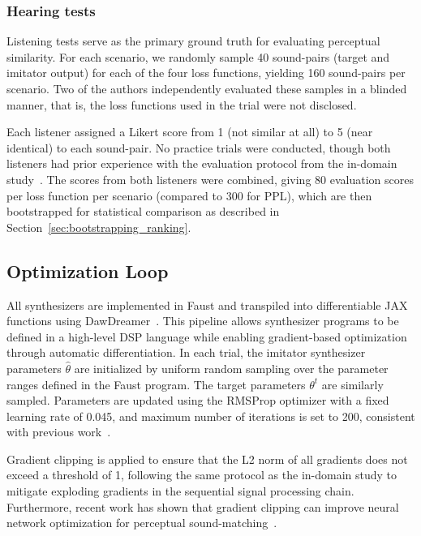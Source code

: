 \documentclass[10pt]{article} %
\begin{document}
\subsubsection{Hearing tests}
Listening tests serve as the primary ground truth for evaluating perceptual similarity. For each scenario, we randomly sample 40 sound-pairs (target and imitator output) for each of the four loss functions, yielding 160 sound-pairs per scenario. Two of the authors independently evaluated these samples in a blinded manner, that is, the loss functions used in the trial were not disclosed.

Each listener assigned a Likert score from 1 (not similar at all) to 5 (near identical) to each sound-pair. No practice trials were conducted, though both listeners had prior experience with the evaluation protocol from the in-domain study~\cite{salimi2025evaluating}. The scores from both listeners were combined, giving 80 evaluation scores per loss function per scenario (compared to 300 for PPL), which are then bootstrapped for statistical comparison as described in Section~\ref{sec:bootstrapping_ranking}.


\subsection{Optimization Loop}
\label{subsec:optimization}

All synthesizers are implemented in Faust and transpiled into differentiable JAX functions using DawDreamer~\cite{braun2024dac}. This pipeline allows synthesizer programs to be defined in a high-level DSP language while enabling gradient-based optimization through automatic differentiation. In each trial, the imitator synthesizer parameters $\hat{\theta}$ are initialized by uniform random sampling over the parameter ranges defined in the Faust program. The target parameters $\theta^t$ are similarly sampled. Parameters are updated using the RMSProp optimizer with a fixed learning rate of 0.045, and maximum number of iterations is set to 200, consistent with previous work~\cite{salimi2025evaluating}. 

Gradient clipping is applied to ensure that the L2 norm of all gradients does not exceed a threshold of 1, following the same protocol as the in-domain study to mitigate exploding gradients in the sequential signal processing chain. Furthermore, recent work has shown that gradient clipping can improve neural network optimization for perceptual sound-matching~\cite{han2025gradient}. 
\end{document}
